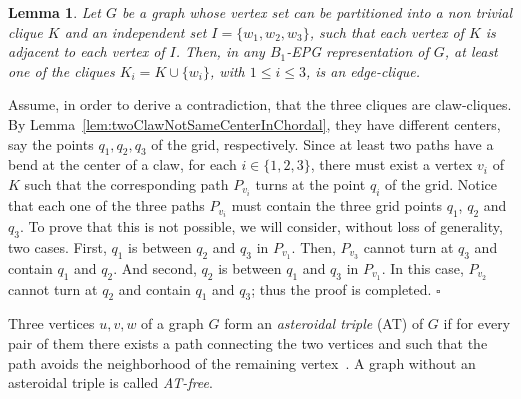 \documentclass[9pt]{entcs}
\newtheorem{lema}[thm]{Lemma}%
\newtheorem{defi}[thm]{Definition}%
\begin{document}



\begin{lema}\label{lem:3cliquesNotClaw}
Let $G$ be a graph whose vertex set  can be
partitioned into a non trivial clique $K$ and an independent set $I=\{w_1,w_2,w_3\}$, such that each vertex of $K$ is adjacent to each vertex of $I$. Then, in any $B_1$-EPG representation of $G$, at least one of the cliques  $K_i = K \cup \{w_i\}$, with $1 \leq i \leq 3$,  is an edge-clique. 
\end{lema}

\begin{pf}
Assume, in order to derive a contradiction, that the three cliques are claw-cliques. By Lemma~\ref{lem:twoClawNotSameCenterInChordal}, they have different centers, say the points $q_1, q_2, q_3$ of the grid, respectively. Since at least two paths have a bend at the center of a claw, for each $i\in\{1,2,3\}$,   there must exist a vertex
  $v_i$ of $K$ such that the corresponding path $P_{v_i}$ turns at the point $q_i$ of the grid.  Notice that each one of the three paths $P_{v_i}$
  must contain  the three grid points $q_1$, $q_2$ and $q_3$. To prove that this is not possible, we will consider, without loss of generality, two cases.
  First,  $q_1$ is between $q_2$ and $q_3$ in $P_{v_1}$. Then, $P_{v_3}$ cannot turn at $q_3$ and contain $q_1$ and $q_2$.   And second,
  $q_2$ is between $q_1$ and $q_3$ in $P_{v_1}$. In this case, $P_{v_2}$ cannot turn at $q_2$ and contain $q_1$ and $q_3$; thus the proof is completed.
 $\square$
\end{pf}

Three vertices $u, v, w$ of a graph $G$ form an \textit{asteroidal triple} (AT) of $G$ if for every pair of them there exists a path connecting the two vertices and such that the path avoids the neighborhood of the remaining vertex~\cite{Asinowski2009}. A graph without an asteroidal triple is called \textit{AT-free}. 
\end{document}
